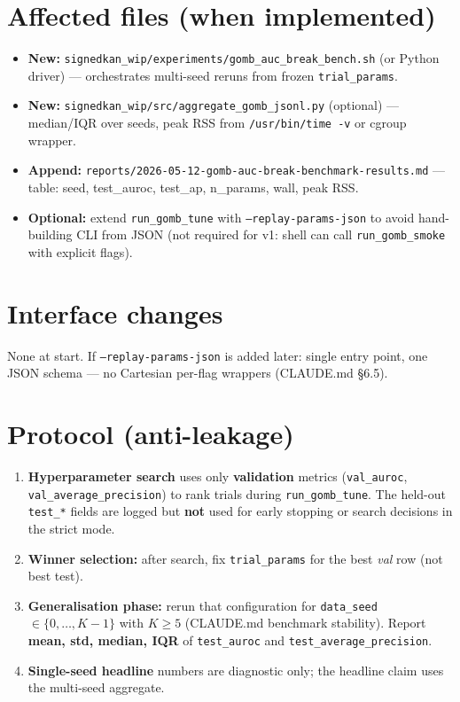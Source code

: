 \documentclass{article}
\begin{document}
\section*{Affected files (when implemented)}
\begin{itemize}
  \item \textbf{New:} \texttt{signedkan\_wip/experiments/gomb\_auc\_break\_bench.sh}
  (or Python driver) --- orchestrates multi-seed reruns from frozen
  \texttt{trial\_params}.
  \item \textbf{New:} \texttt{signedkan\_wip/src/aggregate\_gomb\_jsonl.py} (optional)
  --- median/IQR over seeds, peak RSS from \texttt{/usr/bin/time -v} or
  cgroup wrapper.
  \item \textbf{Append:} \texttt{reports/2026-05-12-gomb-auc-break-benchmark-results.md}
  --- table: seed, test\_auroc, test\_ap, n\_params, wall, peak RSS.
  \item \textbf{Optional:} extend \texttt{run\_gomb\_tune} with
  \texttt{--replay-params-json} to avoid hand-building CLI from JSON (not
  required for v1: shell can call \texttt{run\_gomb\_smoke} with explicit flags).
\end{itemize}

\section*{Interface changes}
None at start. If \texttt{--replay-params-json} is added later: single entry
point, one JSON schema --- no Cartesian per-flag wrappers (CLAUDE.md \S6.5).

\section*{Protocol (anti-leakage)}
\begin{enumerate}
  \item \textbf{Hyperparameter search} uses only \textbf{validation} metrics
  (\texttt{val\_auroc}, \texttt{val\_average\_precision}) to rank trials during
  \texttt{run\_gomb\_tune}. The held-out \texttt{test\_*} fields are logged but
  \textbf{not} used for early stopping or search decisions in the strict mode.
  \item \textbf{Winner selection:} after search, fix \texttt{trial\_params} for
  the best \emph{val} row (not best test).
  \item \textbf{Generalisation phase:} rerun that configuration for
  \texttt{data\_seed} $\in \{0,\ldots,K-1\}$ with $K \geq 5$ (CLAUDE.md
  benchmark stability). Report \textbf{mean, std, median, IQR} of
  \texttt{test\_auroc} and \texttt{test\_average\_precision}.
  \item \textbf{Single-seed headline} numbers are diagnostic only; the
  headline claim uses the multi-seed aggregate.
\end{enumerate}
\end{document}
